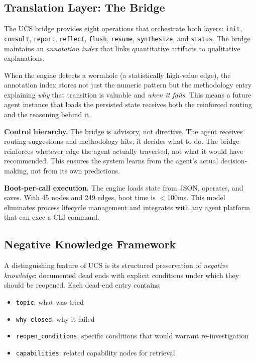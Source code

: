 \documentclass[11pt,a4paper]{article}
\begin{document}
\subsection{Translation Layer: The Bridge}

The UCS bridge provides eight operations that orchestrate both layers:
\texttt{init}, \texttt{consult}, \texttt{report}, \texttt{reflect},
\texttt{flush}, \texttt{resume}, \texttt{synthesize}, and
\texttt{status}. The bridge maintains an \emph{annotation index} that
links quantitative artifacts to qualitative explanations.

When the engine detects a wormhole (a statistically high-value edge),
the annotation index stores not just the numeric pattern but the
methodology entry explaining \emph{why} that transition is valuable
and \emph{when it fails}. This means a future agent instance that loads
the persisted state receives both the reinforced routing and the
reasoning behind it.

\textbf{Control hierarchy.} The bridge is advisory, not directive.
The agent receives routing suggestions and methodology hits; it decides
what to do. The bridge reinforces whatever edge the agent actually
traversed, not what it would have recommended. This ensures the system
learns from the agent's actual decision-making, not from its own
predictions.

\textbf{Boot-per-call execution.} The engine loads state from JSON,
operates, and saves. With 45 nodes and 249 edges, boot time is
$<$100ms. This model eliminates process lifecycle management and
integrates with any agent platform that can exec a CLI command.

\subsection{Negative Knowledge Framework}

A distinguishing feature of UCS is its structured preservation of
\emph{negative knowledge}: documented dead ends with explicit
conditions under which they should be reopened. Each dead-end entry
contains:

\begin{itemize}[leftmargin=*]
\item \texttt{topic}: what was tried
\item \texttt{why\_closed}: why it failed
\item \texttt{reopen\_conditions}: specific conditions that would
  warrant re-investigation
\item \texttt{capabilities}: related capability nodes for retrieval
\end{itemize}
\end{document}
